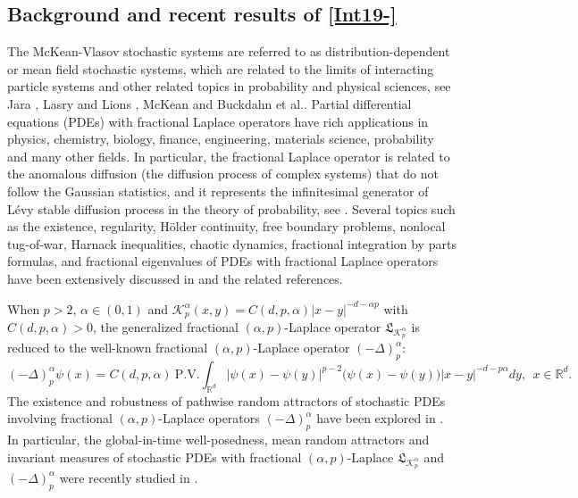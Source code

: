 \documentclass[11pt]{article}
\numberwithin{equation}{section}
\begin{document}
\subsection{Background and  recent  results of \eqref{Int19-}}
The McKean-Vlasov stochastic systems are
referred to as distribution-dependent or mean field stochastic systems, which are related to
the limits of interacting particle systems and other related topics in probability and physical sciences, see Jara \cite{Jara}, Lasry and Lions \cite{Lasry1}, McKean \cite{McKean} and  Buckdahn et al.\cite{Buckdahn}.
Partial differential equations (PDEs) with fractional Laplace operators have rich applications in
physics, chemistry, biology, finance, engineering, materials science, probability and
many other fields. In particular,
the fractional Laplace operator is related to the anomalous diffusion (the
diffusion process of complex systems) that do not follow the Gaussian statistics, and it represents the infinitesimal generator of
L\'{e}vy stable diffusion process in the theory of probability, see \cite{Abe,Jara,Sato}.
Several
 topics such as the existence, regularity, H\"{o}lder continuity, free boundary problems, nonlocal tug-of-war, Harnack inequalities, chaotic dynamics, fractional integration by parts formulas, and fractional eigenvalues of PDEs with fractional Laplace
operators have been extensively discussed in \cite{Byun,Brasco1,Barrios,Bjorland,Caffarelli,
Caffarelli-,
Castro1,Di2012bull,
Grigorenko,Lindgren,Muratori,Maz,Moen,Silvestre,Servadei}
and the related references.







When $p>2$, $\alpha\in(0,1)$ and $\mathcal{K}_{p}^\alpha(x,y)=C(d,p,\alpha)|x-y|^{-d-\alpha p}$ with $C(d,p,\alpha)>0$, the generalized fractional $(\alpha,p)$-Laplace operator $\mathfrak{L}_{\mathcal{K}_{p}^\alpha}$ is reduced to the well-known fractional $(\alpha,p)$-Laplace
operator $(-\Delta)_{p}^\alpha$:
$$(-\Delta)_{p}^\alpha\psi(x)
=C(d,p,\alpha)\ \mbox{P.V.}\int_{\mathbb{R}^d}|\psi(x)-\psi(y)|^{p-2}
\big(\psi(x)-\psi(y)\big)|x-y|^{-d-p\alpha }dy, \ \ x\in\mathbb{R}^d.
 $$
The existence and robustness of
pathwise random attractors of stochastic PDEs involving fractional $(\alpha,p)$-Laplace
operators $(-\Delta)_{p}^\alpha$ have been explored in \cite{Chenpa,Wang-wangb,Wang-wangb2}.
In particular, the global-in-time well-posedness, mean random attractors and invariant measures of stochastic PDEs with fractional $(\alpha,p)$-Laplace $\mathfrak{L}_{\mathcal{K}_{p}^\alpha}$ and
$(-\Delta)_{p}^\alpha$ were recently studied in \cite{Wangjde,RWangsubmitted}.
\end{document}
